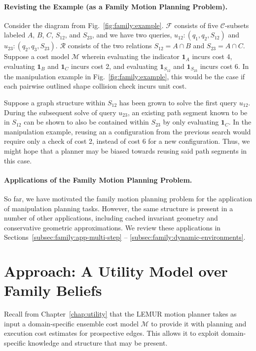\paragraph{Revisting the Example (as a Family Motion Planning Problem).}
Consider the diagram from Fig.~\ref{fig:family:example}.
$\mathcal{F}$ consists of five $\mathcal{C}$-subsets labeled
$A$, $B$, $C$, $S_{12}$, and $S_{23}$,
and we have two queries,
$u_{12}: (q_1, q_2, S_{12})$
and
$u_{23}: (q_2, q_3, S_{23})$.
$\mathcal{R}$ consists of the two relations
$S_{12} = A \cap B$ and $S_{23} = A \cap C$.
Suppose a cost model $\mathcal{M}$
wherein evaluating the indicator
$\mathbf{1}_A$ incurs cost 4,
evaluating $\mathbf{1}_B$ and $\mathbf{1}_C$ incurs cost 2,
and evaluating $\mathbf{1}_{S_{12}}$ and $\mathbf{1}_{S_{23}}$
incurs cost 6.
In the manipulation example in
Fig.~\ref{fig:family:example},
this would be the case if each
pairwise outlined shape collision check incurs unit cost.

Suppose a graph structure within ${S_{12}}$ has been grown to solve
the first query $u_{12}$.
During the subsequent solve of query $u_{23}$,
an existing path segment known to be in ${S_{12}}$ can be shown to
also be contained within ${S_{23}}$ by only evaluating $\mathbf{1}_C$.
In the manipulation example,
reusing an a configuration from the previous search
would require only a check of cost 2,
instead of cost 6 for a new configuration.
Thus, we might hope that a planner may be biased towards reusing
said path segments in this case.

\paragraph{Applications of the Family Motion Planning Problem.}
So far,
we have motivated the family motion planning problem
for the application of manipulation planning tasks.
However,
the same structure is present in a number of other applications,
including cached invariant geometry
and conservative geometric approximations.
We review these applications
in Sections~\ref{subsec:family:app-multi-step}
-- \ref{subsec:family:dynamic-environments}.

\section{Approach: A Utility Model over Family Beliefs}
\label{sec:family:approach}

Recall from Chapter~\ref{chap:utility}
that the LEMUR motion planner takes as input
a domain-specific ensemble cost model
$\mathcal{M}$ to provide it with planning and execution cost
estimates for prospective edges.
This allows it to exploit domain-specific
knowledge and structure that may be present.

